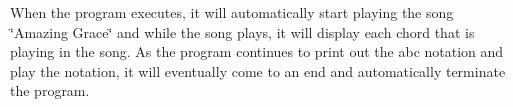 When the program executes, it will automatically start playing the song \char`\"{}\+Amazing Grace\char`\"{} and while the song plays, it will display each chord that is playing in the song. As the program continues to print out the abc notation and play the notation, it will eventually come to an end and automatically terminate the program. 
